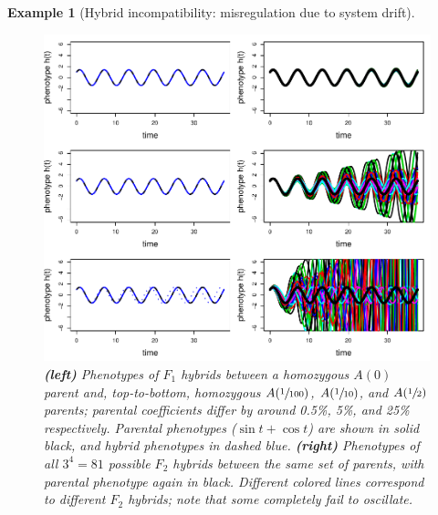 \documentclass{article}
\newcommand{\1}{\mathbbm{1}}
\newtheorem{example}{Example}
\begin{document}
\begin{example}[Hybrid incompatibility: misregulation due to system drift]
\begin{figure}[H]
  \centering
  \includegraphics{examples/f1f2_small}
  \caption{
    \textbf{(left)} Phenotypes of $F_1$ hybrids between a homozygous $A(0)$ parent and, 
    top-to-bottom, homozygous $A(\sfrac{1}{100})$, $A(\sfrac{1}{10})$, and $A(\sfrac{1}{2})$ parents;
    parental coefficients differ by around 0.5\%, 5\%, and 25\% respectively.
    Parental phenotypes ($\sin t + \cos t$) are shown in solid black, and hybrid phenotypes in dashed blue.
    \textbf{(right)} Phenotypes of all $3^4 = 81$ possible $F_2$ hybrids between the same set of parents,
    with parental phenotype again in black.
    Different colored lines correspond to different $F_2$ hybrids;
    note that some completely fail to oscillate.
  } \label{fig:hybs}
\end{figure}


\end{example}
\end{document}
